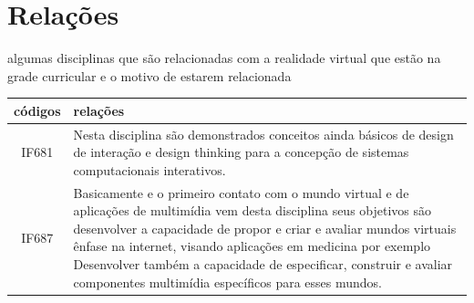 \documentclass[10pt]{article}
\begin{document}
\section{Relações}


algumas disciplinas que são relacionadas com a realidade virtual que estão na grade curricular e o motivo de estarem relacionada
\begin{center}
\begin{tabular}{|c|p{10cm}|}
\hline
códigos & relações \\ \hline
 IF681 &
 Nesta disciplina são demonstrados conceitos ainda básicos de design de interação e design thinking para a concepção de sistemas computacionais interativos.\cite{terceira}
 \\ \hline
  IF687  & 
Basicamente e o primeiro contato com o mundo virtual e de aplicações de multimídia vem desta disciplina seus objetivos são desenvolver a capacidade de propor e criar e avaliar mundos virtuais ênfase na internet, visando aplicações em medicina por exemplo
Desenvolver também a capacidade de especificar, construir e avaliar componentes multimídia específicos para esses mundos. \cite{quarta}
\\ \hline

\end{tabular}    
\end{center}




\end{document}
